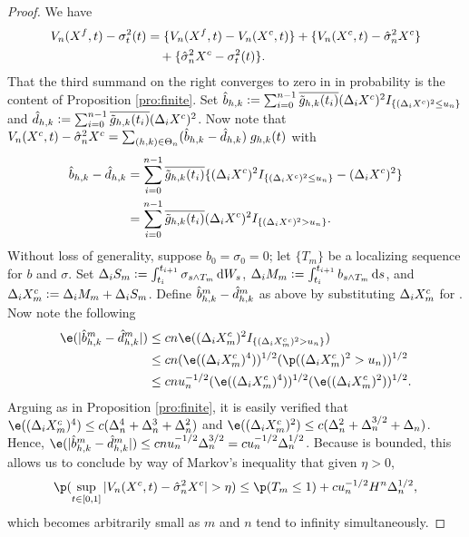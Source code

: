 \begin{proof} 
We have
\begin{align}
V_n(X^f,t)  - \sigma_t^2(t) & = \{V_n(X^f,t)  - V_n(X^c, t)\}  + \{V_n(X^c,t)  - \hat{\sigma}_{n}^2{X^c}\} \notag \\
& \quad +  \{ \hat{\sigma}_{n}^2{X^c} - \sigma_t^2(t)\}. \label{eq:now}
\end{align}
That the third summand on the right converges to zero
in \Ltwo in  probability is the content of Proposition \ref{pro:finite}. 
Set
    $\hat{b}_{h,k} := \sum_{i =0}^{n-1} \overline{\tilde{g}_{h,k}(t_i)} (\Delta_i X^c)^2I_{\{(\Delta_i X^c)^2 \le  u_n\}}$ and  
  $\hat{d}_{h,k} := \sum_{i =0}^{n-1} \overline{\tilde{g}_{h,k}(t_i)} (\Delta_i X^c)^2$.
Now note that
$V_n(X^c,t)  - \hat{\sigma}_{n}^2{X^c} = \sum_{(h,k) \in \Theta_n} (\hat{b}_{h,k}  - \hat{d}_{h,k})\;g_{h,k}(t)$ 
with 
\begin{align}
  \hat{b}_{h,k}  - \hat{d}_{h,k} &= \sum_{i =0}^{n-1} \overline{\tilde{g}_{h,k}(t_i)}\{ (\Delta_i X^c)^2 I_{\{(\Delta_i X^c)^2 \le u_n\}}- (\Delta_i X^c)^2\}\notag\\
  &= \sum_{i =0}^{n-1} \overline{\tilde{g}_{h,k}(t_i)} (\Delta_i X^c)^2 I_{\{(\Delta_i X^c)^2 > u_n\}} \notag.
  \label{}
\end{align} 
Without loss of generality, suppose $b_0 = \sigma_0 = 0$; let $\{T_m\}$ be a localizing sequence for $b$ and $\sigma$.   
Set $\Delta_i S_m := \int_{t_i}^{t_{i+1}} \sigma_{s\wedge T_m} \D W_s$, $\Delta_i M_m := \int_{t_i}^{t_{i+1}} b_{s\wedge T_m} \D s$, and $\Delta_i X^c_m :=  \Delta_i M_m + \Delta_i S_m$. Define $\hat{b}^m_{h,k}  - \hat{d}_{h,k}^m$ as above by substituting $\Delta_i X^c_m$ for \dxc. Now note the following
\begin{align}
  \e(\vert \hat{b}^m_{h,k}  - \dnhk^m \vert ) &\le c n \e( (\dxc_m)^2 I_{\{( \dxc_m)^2 > u_n\}})\notag\\
  & \le c n (\e( (\dxc_m)^4))^{1/2}  (\p(( \dxc_m)^2 > u_n))^{1/2}\notag\\
  & \le c n u_n^{-1/2} (\e( (\dxc_m)^4))^{1/2}  (\e(( \dxc_m)^2))^{1/2}\notag.
  \label{}
\end{align}
Arguing as in Proposition \ref{pro:finite}, it is easily verified that $\e( (\dxc_m)^4) \le  c (\Delta_n^4 + \Delta_n^3 + \Delta_n^2)$ and $ \e( (\dxc_m)^2)  \le  c(\Delta_n^2 + \Delta_n^{3/2} + \Delta_n)$. Hence, $\e(\vert \hat{b}^m_{h,k}  - \dnhk^m \vert ) \le c n u_n^{-1/2}\Delta^{3/2}_n = c u_n^{-1/2}\Delta^{1/2}_n $. Because \tghk is bounded, this allows us to conclude by way of Markov's inequality that given $\eta > 0$, 
\begin{align}
  \p(\sup_{t \in \domain} \vert V_n(X^c,t)  - \svn{X^c} \vert > \eta) \le \p(T_m \le 1) + c u^{-1/2}_n H^n \Delta_n^{1/2},\notag
  \label{}
\end{align}
which becomes arbitrarily small as $m$ and $n$ tend to infinity simultaneously.


\end{proof}
